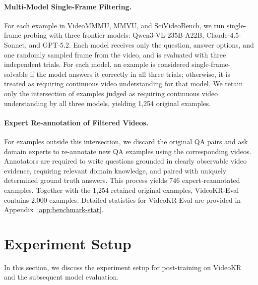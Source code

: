 \documentclass{llmxive}
\providecommand{\eval}{VideoKR-Eval\xspace}
\providecommand{\ours}{VideoKR\xspace}
\begin{document}
\vspace{-8pt}
\paragraph{Multi-Model Single-Frame Filtering.}
For each example in VideoMMMU, MMVU, and SciVideoBench, we run single-frame probing with three frontier models: Qwen3-VL-235B-A22B, Claude-4.5-Sonnet, and GPT-5.2. Each model receives only the question, answer options, and one randomly sampled frame from the video, and is evaluated with three independent trials. For each model, an example is considered single-frame-solvable if the model answers it correctly in all three trials; otherwise, it is treated as requiring continuous video understanding for that model. We retain only the intersection of examples judged as requiring continuous video understanding by all three models, yielding 1,254 original examples.
\vspace{-8pt}
\paragraph{Expert Re-annotation of Filtered Videos.}
For examples outside this intersection, we discard the original QA pairs and ask domain experts to re-annotate new QA examples using the corresponding videos. Annotators are required to write questions grounded in clearly observable video evidence, requiring relevant domain knowledge, and paired with uniquely determined ground truth answers. This process yields 746 expert-reannotated examples. Together with the 1,254 retained original examples, \eval contains 2,000 examples.
Detailed statistics for \eval are provided in Appendix~\ref{app:benchmark-stat}.

\section{Experiment Setup}
In this section, we discuss the experiment setup for post-training on \ours and the subsequent model evaluation.
\end{document}
